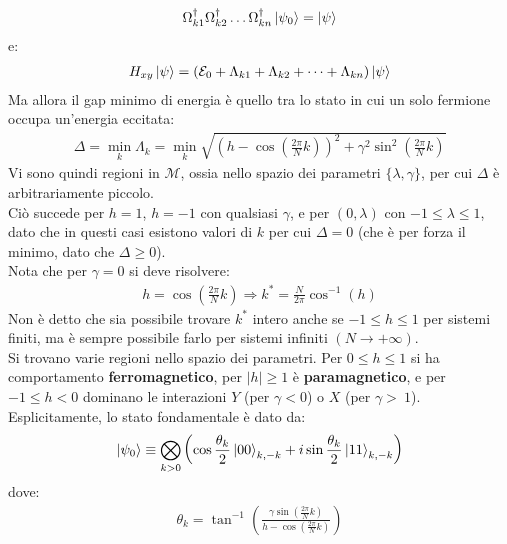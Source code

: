 \documentclass[../../InformazioneQuantistica.tex]{subfiles}
\begin{document}
\begin{align*}
\Omega_{k1}^\dag \Omega_{k2}^\dag \dots \Omega_{kn}^\dag \Ket{\psi_0} = \Ket{\psi}
\end{align*}
e:
\begin{align*}
H_{xy}\Ket{\psi}=\left(\mathcal{E}_0 + \Lambda_{k1} + \Lambda_{k2} + \dots + \Lambda_{kn}\right) \Ket{\psi}
\end{align*}
Ma allora il gap minimo di energia è quello tra lo stato in cui un solo fermione occupa un'energia eccitata:
\begin{align*}
\Delta = \min_k \Lambda_k = \min_k \sqrt{\left(h-\cos\left(\frac{2\pi}{N}k\right) \right)^2 + \gamma^2 \sin^2\left(\frac{2\pi}{N}k\right)}
\end{align*}
Vi sono quindi regioni in $\mathcal{M}$, ossia nello spazio dei parametri $\{\lambda,\gamma\}$, per cui $\Delta$ è arbitrariamente piccolo.\\
Ciò succede per $h=1$, $h=-1$ con qualsiasi $\gamma$, e per $(0,\lambda)$ con $-1 \leq \lambda \leq 1$, dato che in questi casi esistono valori di $k$ per cui $\Delta = 0$ (che è per forza il minimo, dato che $\Delta \geq 0$).\\
Nota che per $\gamma=0$ si deve risolvere:
\begin{align*}
h= \cos\left(\frac{2\pi}{N}k\right) \Rightarrow k^* = \frac{N}{2\pi} \cos^{-1}(h)
\end{align*}
Non è detto che sia possibile trovare $k^*$ intero anche se $-1\leq h\leq 1$ per sistemi finiti, ma è sempre possibile farlo per sistemi infiniti $(N\to +\infty)$.\\

Si trovano varie regioni nello spazio dei parametri. Per $0\leq h \leq 1$ si ha comportamento \textbf{ferromagnetico}, per $|h|\geq 1$ è \textbf{paramagnetico}, e per $-1\leq h <0$ dominano le interazioni $Y$ (per $\gamma < 0$) o $X$ (per $\gamma >\ 1$).\\

Esplicitamente, lo stato fondamentale è dato da:
\begin{align*}
\Ket{\psi_0} \equiv \bigotimes_{k>0} \left(\cos\frac{\theta_k}{2} \Ket{00}_{k,-k} + i\sin\frac{\theta_k}{2} \Ket{11}_{k,-k}\right)
\end{align*}
dove:
\begin{align*}
\theta_k = \tan^{-1} \left(\frac{\gamma \sin\left(\frac{2\pi}{N}k\right)}{h - \cos\left(\frac{2\pi}{N}k\right)}\right)
\end{align*}
\end{document}
